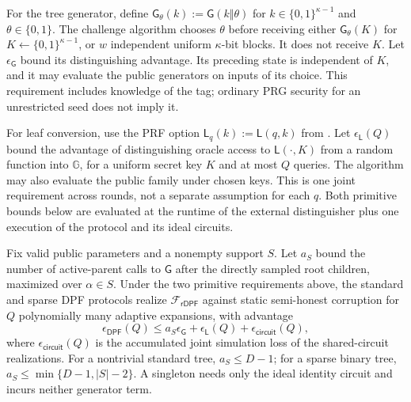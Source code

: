 For the tree generator, define
$\mathsf G_\theta(k):=\mathsf G(k\Vert\theta)$ for
$k\in\{0,1\}^{\kappa-1}$ and $\theta\in\{0,1\}$.
The challenge algorithm chooses $\theta$ before receiving either
$\mathsf G_\theta(K)$ for $K\gets\{0,1\}^{\kappa-1}$, or $w$ independent
uniform $\kappa$-bit blocks. It does not receive $K$.
Let $\epsilon_{\mathsf G}$ bound its distinguishing advantage.
Its preceding state is independent of $K$, and it may evaluate the public
generators on inputs of its choice. This requirement includes knowledge of
the tag; ordinary PRG security for an unrestricted seed does not imply it.

For leaf conversion, use the PRF option
$\mathsf L_q(k):=\mathsf L(q,k)$ from .
Let $\epsilon_{\mathsf L}(Q)$ bound the advantage of distinguishing
oracle access to $\mathsf L(\cdot,K)$ from a random function into
$\mathbb G$, for a uniform secret key $K$ and at most $Q$ queries.
The algorithm may also evaluate the public family under chosen keys.
This is one joint requirement across rounds, not a separate assumption
for each $q$. Both primitive bounds below are evaluated at the runtime of
the external distinguisher plus one execution of the protocol and its
ideal circuits.

\begin{theorem}
\label{thm:reusable-dpf-simulation}
Fix valid public parameters and a nonempty support $S$. Let $a_S$ bound
the number of active-parent calls to $\mathsf G$ after the directly sampled
root children, maximized over $\alpha\in S$.
Under the two primitive requirements above, the standard and sparse DPF
protocols realize $\mathcal F_{\mathsf{rDPF}}$ against static semi-honest
corruption for $Q$ polynomially many adaptive expansions, with advantage
\[
 \epsilon_{\mathsf{DPF}}(Q)
 \leq a_S\epsilon_{\mathsf G}+\epsilon_{\mathsf L}(Q)
       +\epsilon_{\mathsf{circuit}}(Q),
\]
where $\epsilon_{\mathsf{circuit}}(Q)$ is the accumulated joint simulation
loss of the shared-circuit realizations. For a nontrivial standard tree,
$a_S\leq D-1$; for a sparse binary tree,
$a_S\leq\min\{D-1,|S|-2\}$. A singleton needs only the ideal identity
circuit and incurs neither generator term.
\end{theorem}

